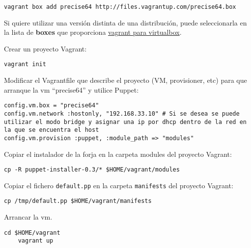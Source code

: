 \lstset{style=rubybasico}
\begin{lstlisting}[frame=trbl]
    vagrant box add precise64 http://files.vagrantup.com/precise64.box
\end{lstlisting}

\par Si quiere utilizar una versión distinta de una distribución, puede seleccionarla en la lista de \textbf{boxes} que proporciona \href{http://www.vagrantbox.es/}{vagrant para virtualbox}.

\par Crear un proyecto Vagrant:

\lstset{style=rubybasico}
\begin{lstlisting}[frame=trbl]
    vagrant init
\end{lstlisting}

\par Modificar el Vagrantfile que describe el proyecto (VM, provisioner, etc) para que arranque la vm ``precise64'' y utilice Puppet:

\lstset{style=rubybasico}
\begin{lstlisting}[frame=trbl]
config.vm.box = "precise64"
config.vm.network :hostonly, "192.168.33.10" # Si se desea se puede utilizar el modo bridge y asignar una ip por dhcp dentro de la red en la que se encuentra el host
config.vm.provision :puppet, :module_path => "modules"

\end{lstlisting}

\par Copiar el instalador de la forja en la carpeta modules del proyecto Vagrant:

\lstset{style=rubybasico}
\begin{lstlisting}[frame=trbl]
    cp -R puppet-installer-0.3/* $HOME/vagrant/modules
\end{lstlisting}

\par Copiar el fichero \texttt{default.pp} en la carpeta \texttt{manifests} del proyecto Vagrant:

\lstset{style=rubybasico}
\begin{lstlisting}[frame=trbl]
    cp /tmp/default.pp $HOME/vagrant/manifests
\end{lstlisting}

\par Arrancar la vm.

\lstset{style=rubybasico}
\begin{lstlisting}[frame=trbl]
    cd $HOME/vagrant
    vagrant up
\end{lstlisting}

